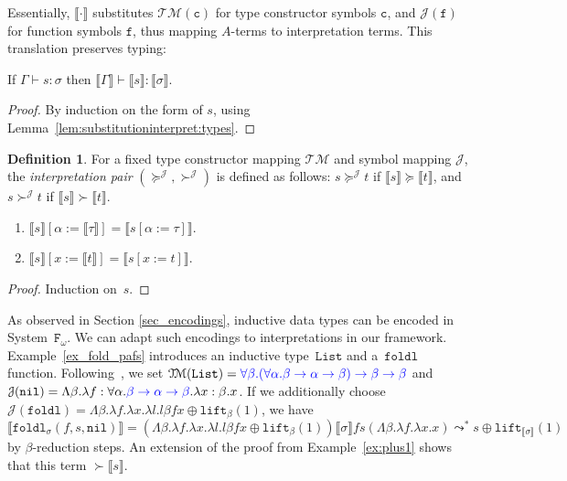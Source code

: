 \documentclass[a4paper,UKenglish,cleveref,autoref,numberwithinsect]{lipics-v2019}
\theoremstyle{definition}
\newtheorem{defn}[theorem]{Definition}
\newcommand{\Fomega}{\mathtt{F}_\omega}
\newcommand{\arrtype}{\rightarrow}
\newcommand{\quant}[2]{\forall #1.#2}
\newcommand{\abs}[2]{\lambda #1.#2}
\newcommand{\tabs}[2]{\Lambda #1.#2}
\newcommand{\lift}{\mathtt{lift}}
\newcommand{\typeinterpret}[1]{\llbracket #1 \rrbracket}
\newcommand{\interpret}[1]{\llbracket #1 \rrbracket}
\newcommand{\itp}[1]{\llbracket #1 \rrbracket}
\newcommand{\Typemap}{\mathcal{T\!M}}
\newcommand{\Termmap}{\mathcal{J}}
\newcommand{\succinterpret}{\succ^{\Termmap}}
\newcommand{\succeqinterpret}{\succeq^{\Termmap}}
\newcommand{\List}{\mathtt{List}}
\newcommand{\nil}{\mathtt{nil}}
\newcommand{\CKchange}[1]{\textcolor{blue}{#1}}
\begin{document}
Essentially, $\interpret{\cdot}$ substitutes
$\Typemap(\mathtt{c})$ for type constructor symbols $\mathtt{c}$, and
$\Termmap(\mathtt{f})$ for function symbols $\mathtt{f}$, thus mapping
$A$-terms to interpretation terms.  This translation preserves typing:

\begin{lemma}
  If $\Gamma \vdash s : \sigma$ then $\itp{\Gamma} \vdash
  \interpret{s} : \typeinterpret{\sigma}$.
\end{lemma}

\begin{proof}
  By induction on the form of $s$, using
  Lemma~\ref{lem:substitutioninterpret:types}.
\end{proof}

\begin{defn}
  For a fixed type constructor mapping $\Typemap$ and symbol mapping
  $\Termmap$, the \emph{interpretation pair}
  $(\succeqinterpret,\succinterpret)$ is defined as follows: $s
  \succeqinterpret t$ if $\interpret{s} \succeq \interpret{t}$, and $s
  \succinterpret t$ if $\interpret{s} \succ \interpret{t}$.
\end{defn}

\begin{lemma}\label{lem:substitutioninterpret}
  \begin{enumerate}
  \item\label{lem:substitutioninterpret:mixed}
    $\interpret{s}[\alpha:=\typeinterpret{\tau}] =
    \interpret{s[\alpha:=\tau]}$.
  \item\label{lem:substitutioninterpret:terms}
    $\interpret{s}[x:=\interpret{t}] = \interpret{s[x:=t]}$.
  \end{enumerate}
\end{lemma}

\begin{proof}
  Induction on~$s$.
\end{proof}

\begin{example}\label{ex:notyetmono}
As observed in Section \ref{sec_encodings}, inductive data
types can be encoded in System~$\Fomega$.  We can adapt such encodings
to interpretations in our framework.  Example~\ref{ex_fold_pafs}
introduces an inductive type~$\List$ and a~$\mathtt{foldl}$ function.
Following~\cite[Chapter~11]{Girard1989},
we set $\Typemap(\List) = \CKchange{\quant{\beta}{(\quant{\alpha}{\beta \arrtype
\alpha \arrtype \beta})} \arrtype \beta \arrtype \beta}$ and
$\Termmap(\nil) = \tabs{\beta}{\abs{f:\quant{\alpha}{\CKchange{\beta \arrtype
\alpha \arrtype \beta}}}{\abs{x:\beta}{x}}}$.  If we additionally choose
$\Termmap(\mathtt{foldl}) = \tabs{\beta}{\abs{f}{\abs{x}{\abs{l}{l
\beta f x}}} \oplus \lift_\beta(1)}$, we have
$\interpret{\mathtt{foldl}_{\sigma}(f,s,\nil)} = (\tabs{\beta}{
  \abs{f}{\abs{x}{\abs{l}{l \beta f x}}} \oplus \lift_\beta(1)})
  \typeinterpret{\sigma} f s (\tabs{\beta}{\abs{f}{\abs{x}{x}}})
  \leadsto^* s \oplus \lift_{\interpret{\sigma}}(1)$ by
  $\beta$-reduction steps.
An extension of the proof from Example~\ref{ex:plus1} shows that
this term $\succ \interpret{s}$.
\end{example}
\end{document}

